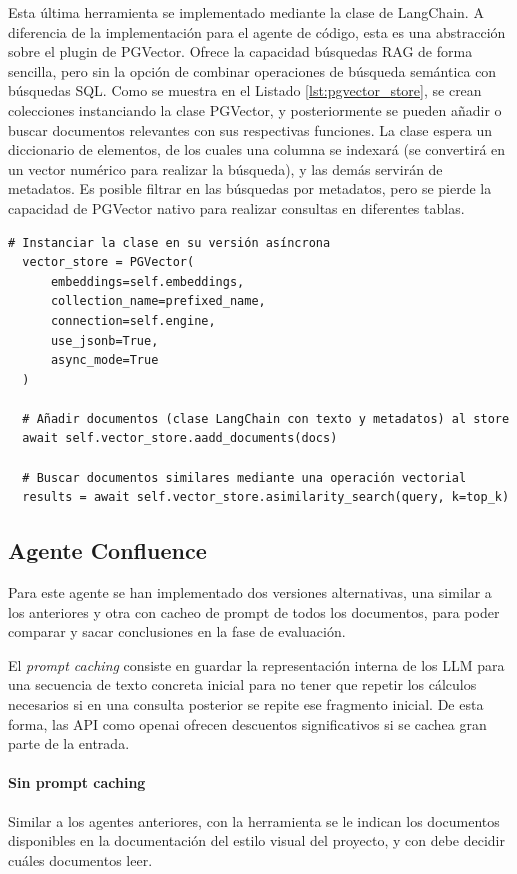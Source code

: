Esta última herramienta se implementado mediante la clase  de LangChain. A diferencia de la implementación para el agente de código, esta es una abstracción sobre el plugin de PGVector. Ofrece la capacidad búsquedas RAG de forma sencilla, pero sin la opción de combinar operaciones de búsqueda semántica con búsquedas SQL. Como se muestra en el Listado \ref{lst:pgvector_store}, se crean colecciones instanciando la clase PGVector, y posteriormente se pueden añadir o buscar documentos relevantes con sus respectivas funciones. La clase espera un diccionario de elementos, de los cuales una columna se indexará (se convertirá en un vector numérico para realizar la búsqueda), y las demás servirán de metadatos. Es posible filtrar en las búsquedas por metadatos, pero se pierde la capacidad de PGVector nativo para realizar consultas en diferentes tablas. 

\begin{lstlisting}[caption={\protect\opus{PGVector}: uso de clase para indexar o buscar documentos}, label={lst:pgvector_store}]
  # Instanciar la clase en su versión asíncrona 
  vector_store = PGVector(
      embeddings=self.embeddings,
      collection_name=prefixed_name,
      connection=self.engine,
      use_jsonb=True,
      async_mode=True
  )

  # Añadir documentos (clase LangChain con texto y metadatos) al store
  await self.vector_store.aadd_documents(docs)

  # Buscar documentos similares mediante una operación vectorial
  results = await self.vector_store.asimilarity_search(query, k=top_k)
\end{lstlisting}

\subsection{Agente Confluence}
Para este agente se han implementado dos versiones alternativas, una similar a los anteriores y otra con cacheo de prompt de todos los documentos, para poder comparar y sacar conclusiones en la fase de evaluación.

El \textit{prompt caching} consiste en guardar la representación interna de los LLM para una secuencia de texto concreta inicial para no tener que repetir los cálculos necesarios si en una consulta posterior se repite ese fragmento inicial. De esta forma, las API como openai ofrecen descuentos significativos si se cachea gran parte de la entrada.

\paragraph{Sin prompt caching}
Similar a los agentes anteriores, con la herramienta  se le indican los documentos disponibles en la documentación del estilo visual del proyecto, y con  debe decidir cuáles documentos leer. 

